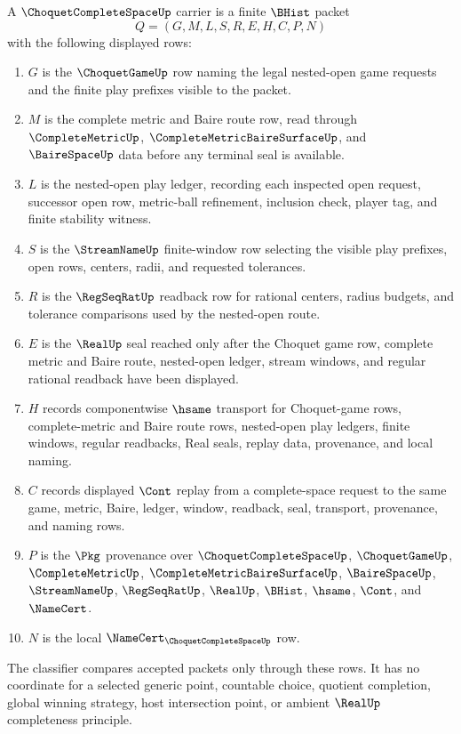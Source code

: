 \begin{definition}
\label{def:choquet-complete-space-carrier}
A $\ChoquetCompleteSpaceUp$ carrier is a finite $\BHist$ packet
$$
Q=(G,M,L,S,R,E,H,C,P,N)
$$
with the following displayed rows:
\begin{enumerate}
\item $G$ is the $\ChoquetGameUp$ row naming the legal nested-open game requests and the finite play prefixes visible to the packet.
\item $M$ is the complete metric and Baire route row, read through $\CompleteMetricUp$, $\CompleteMetricBaireSurfaceUp$, and $\BaireSpaceUp$ data before any terminal seal is available.
\item $L$ is the nested-open play ledger, recording each inspected open request, successor open row, metric-ball refinement, inclusion check, player tag, and finite stability witness.
\item $S$ is the $\StreamNameUp$ finite-window row selecting the visible play prefixes, open rows, centers, radii, and requested tolerances.
\item $R$ is the $\RegSeqRatUp$ readback row for rational centers, radius budgets, and tolerance comparisons used by the nested-open route.
\item $E$ is the $\RealUp$ seal reached only after the Choquet game row, complete metric and Baire route, nested-open ledger, stream windows, and regular rational readback have been displayed.
\item $H$ records componentwise $\hsame$ transport for Choquet-game rows, complete-metric and Baire route rows, nested-open play ledgers, finite windows, regular readbacks, Real seals, replay data, provenance, and local naming.
\item $C$ records displayed $\Cont$ replay from a complete-space request to the same game, metric, Baire, ledger, window, readback, seal, transport, provenance, and naming rows.
\item $P$ is the $\Pkg$ provenance over $\ChoquetCompleteSpaceUp$, $\ChoquetGameUp$, $\CompleteMetricUp$, $\CompleteMetricBaireSurfaceUp$, $\BaireSpaceUp$, $\StreamNameUp$, $\RegSeqRatUp$, $\RealUp$, $\BHist$, $\hsame$, $\Cont$, and $\NameCert$.
\item $N$ is the local $\NameCert_{\ChoquetCompleteSpaceUp}$ row.
\end{enumerate}
The classifier compares accepted packets only through these rows. It has no coordinate for a selected generic point, countable choice, quotient completion, global winning strategy, host intersection point, or ambient $\RealUp$ completeness principle.
\end{definition}


